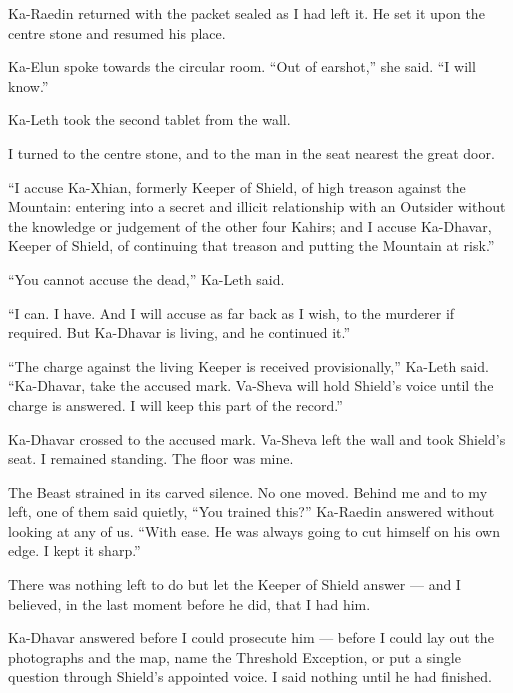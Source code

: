 Ka-Raedin returned with the packet sealed as I had left it. He set it upon the centre stone and resumed his place.\par

Ka-Elun spoke towards the circular room. ``Out of earshot,'' she said. ``I will know.''\par

Ka-Leth took the second tablet from the wall.\par

I turned to the centre stone, and to the man in the seat nearest the great door.\par

``I accuse Ka-Xhian, formerly Keeper of Shield, of high treason against the Mountain: entering into a secret and illicit relationship with an Outsider without the knowledge or judgement of the other four Kahirs; and I accuse Ka-Dhavar, Keeper of Shield, of continuing that treason and putting the Mountain at risk.''\par

``You cannot accuse the dead,'' Ka-Leth said.\par

``I can. I have. And I will accuse as far back as I wish, to the murderer if required. But Ka-Dhavar is living, and he continued it.''\par

``The charge against the living Keeper is received provisionally,'' Ka-Leth said. ``Ka-Dhavar, take the accused mark. Va-Sheva will hold Shield's voice until the charge is answered. I will keep this part of the record.''\par

Ka-Dhavar crossed to the accused mark. Va-Sheva left the wall and took Shield's seat. I remained standing. The floor was mine.\par

The Beast strained in its carved silence. No one moved. Behind me and to my left, one of them said quietly, ``You trained this?'' Ka-Raedin answered without looking at any of us. ``With ease. He was always going to cut himself on his own edge. I kept it sharp.''\par

There was nothing left to do but let the Keeper of Shield answer --- and I believed, in the last moment before he did, that I had him.\par


\ornament

Ka-Dhavar answered before I could prosecute him --- before I could lay out the photographs and the map, name the Threshold Exception, or put a single question through Shield's appointed voice. I said nothing until he had finished.\par

